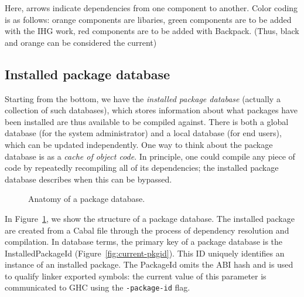 \documentclass{article}
\begin{document}
Here, arrows indicate dependencies from one component to another.  Color
coding is as follows: orange components are libaries, green components
are to be added with the IHG work, red components are to be added with
Backpack.  (Thus, black and orange can be considered the current)

\subsection{Installed package database}

Starting from the bottom, we have the \emph{installed package database}
(actually a collection of such databases), which stores information
about what packages have been installed are thus available to be
compiled against.  There is both a global database (for the system
administrator) and a local database (for end users), which can be
updated independently.  One way to think about the package database
is as a \emph{cache of object code}.  In principle, one could compile
any piece of code by repeatedly recompiling all of its dependencies;
the installed package database describes when this can be bypassed.

\begin{figure}[H]
\label{fig:pkgdb}\caption{Anatomy of a package database.}
\end{figure}

In Figure~\ref{fig:pkgdb}, we show the structure of a package database.
The installed package are created from a Cabal file through the process
of dependency resolution and compilation.  In database terms, the primary key
of a package database is the InstalledPackageId
(Figure~\ref{fig:current-pkgid}).  This ID uniquely identifies an
instance of an installed package.  The PackageId omits the ABI hash and
is used to qualify linker exported symbols: the current value of this
parameter is communicated to GHC using the \verb|-package-id| flag.
\end{document}
